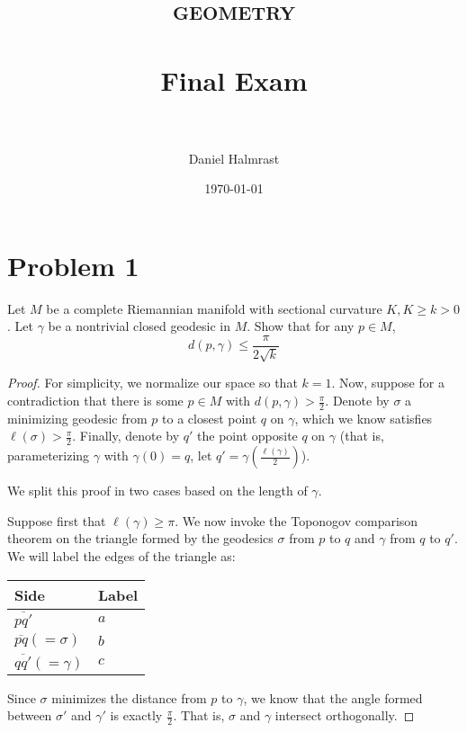 \documentclass[fontsize=11pt]{scrartcl} %
\title{	
\normalfont \normalsize 
\textsc{geometry} \\ [25pt] %
\horrule{0.5pt} \\[0.4cm] %
\huge Final Exam \\ %
\horrule{2pt} \\[0.5cm] %
}
\author{Daniel Halmrast} %
\date{\normalsize\today} %
\numberwithin{equation}{section} %
\numberwithin{figure}{section} %
\numberwithin{table}{section} %
\begin{document}
\maketitle %

\section*{Problem 1}
Let $M$ be a complete Riemannian manifold with sectional curvature $K, K\geq
k>0$. Let $\gamma$ be a nontrivial closed geodesic in $M$. Show that for any
$p\in M$,
\[
    d(p,\gamma)\leq \frac{\pi}{2\sqrt{k}}
\]

\begin{proof}
    For simplicity, we normalize our space so that $k=1$. Now, suppose for a
    contradiction that there is some $p\in M$ with
    $d(p,\gamma)>\frac{\pi}{2}$. Denote by $\sigma$ a minimizing geodesic from
    $p$ to a closest point $q$ on $\gamma$, which we know satisfies
    $\ell(\sigma)>\frac{\pi}{2}$. Finally, denote by $q'$ the point opposite $q$
    on $\gamma$ (that is, parameterizing $\gamma$ with $\gamma(0)=q$, let $q' =
    \gamma(\frac{\ell(\gamma)}{2})$).

    We split this proof in two cases based on the length of $\gamma$.

    Suppose first that $\ell(\gamma)\geq \pi$. We now invoke the Toponogov
    comparison theorem on the triangle formed by the geodesics $\sigma$ from $p$
    to $q$ and $\gamma$ from $q$ to $q'$. We will label the edges of the
    triangle as:
    \begin{center}
        \begin{tabular}{l|l}
            Side & Label\\
            \hline
            $\overline{p q'}$ & $a$\\
            $\overline{p q} (=\sigma)$ & $b$\\
            $\overline{q q'}(=\gamma)$ & $c$
        \end{tabular}
    \end{center}

    Since $\sigma$ minimizes the distance from $p$ to $\gamma$, we know that the
    angle formed between $\sigma'$ and $\gamma'$ is exactly
    $\frac{\pi}{2}$. That is, $\sigma$ and $\gamma$ intersect orthogonally.


\end{proof}
\end{document}
